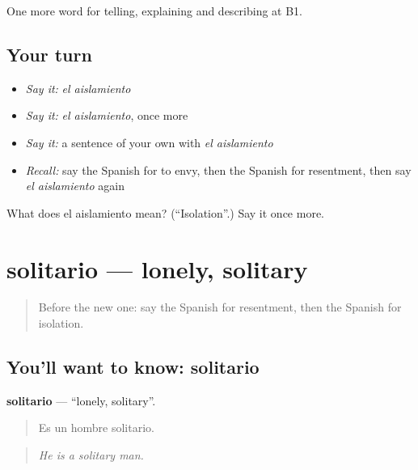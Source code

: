 \begin{grammarlens}[title={What you've built}]
One more word for telling, explaining and describing at B1.
\end{grammarlens}

\subsection*{Your turn}
\begin{itemize}
\raggedright
  \item \emph{Say it:} \emph{el aislamiento}
  \item \emph{Say it:} \emph{el aislamiento}, once more
  \item \emph{Say it:} a sentence of your own with \emph{el aislamiento}
  \item \emph{Recall:} say the Spanish for to envy, then the Spanish for resentment, then say \emph{el aislamiento} again
\end{itemize}

\begin{tcolorbox}[breakable,colback=teal!4,colframe=teal!35!black,title={Before you move on}]
What does el aislamiento mean? (\textquotedblleft{}Isolation\textquotedblright{}.) Say it once more.
\end{tcolorbox}
\section[solitario]{solitario — lonely, solitary}

\label{lesson:ES-C709-solitario}



\begin{quote}
Before the new one: say the Spanish for resentment, then the Spanish for isolation.
\end{quote}

\subsection*{You'll want to know: solitario}
\textbf{solitario} — \textquotedblleft{}lonely, solitary\textquotedblright{}.

\begin{quote}
Es un hombre solitario.
\end{quote}

\begin{quote}
\emph{He is a solitary man.}
\end{quote}

